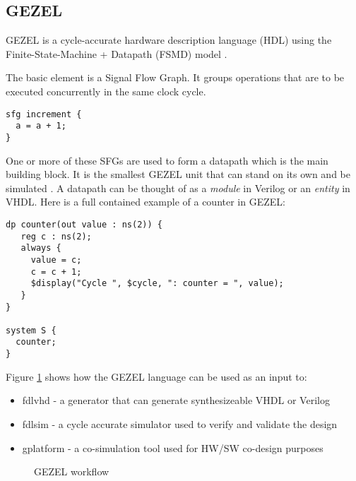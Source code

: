 \subsection{GEZEL}
\label{subsec:gezel}

GEZEL is a cycle-accurate hardware description language (HDL) using the
Finite-State-Machine + Datapath (FSMD) model \cite{gezel}.

The basic element is a Signal Flow Graph. It groups operations that
are to be executed concurrently in the same clock cycle.
\begin{lstlisting}[language=GEZEL]
sfg increment {
  a = a + 1;
}
\end{lstlisting}
One or more of these SFGs are used to form a datapath which is the
main building block. It is the smallest GEZEL unit that can stand on
its own and be simulated \cite{gezel}. A datapath can be thought of as
a \emph{module} in Verilog or an \emph{entity} in VHDL. Here is a
full contained example of a counter in GEZEL:
\begin{lstlisting}[language=GEZEL]
dp counter(out value : ns(2)) {
   reg c : ns(2);
   always {
     value = c;
     c = c + 1;
     $display("Cycle ", $cycle, ": counter = ", value);
   }
}

system S {
  counter;
}
\end{lstlisting}

Figure \ref{fig:gezel_workflow} shows how the GEZEL language
can be used as an input to:
\begin{itemize}
\item fdlvhd - a generator that can generate synthesizeable VHDL or
  Verilog
\item fdlsim - a cycle accurate simulator used to verify and validate
  the design
\item gplatform - a co-simulation tool used for HW/SW co-design purposes
\end{itemize}

\begin{figure}[hb!]
  \centering
  \caption{GEZEL workflow \cite{gezel}}
  \label{fig:gezel_workflow}
\end{figure}

